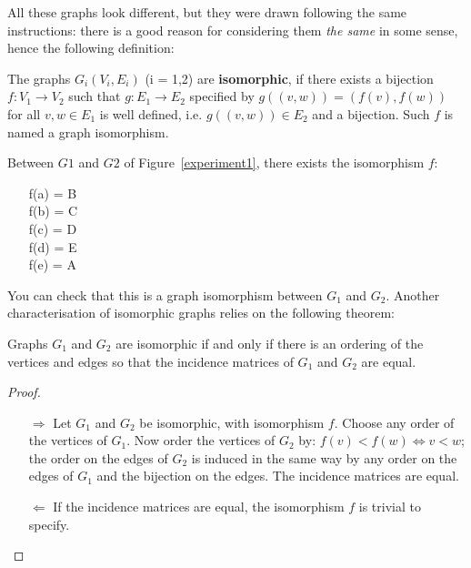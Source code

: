 All these graphs look different, but they were drawn following the
same instructions: there is a good reason for considering them {\em
the same} in some sense, hence the following definition:

\begin{definition}\label{isomorfegraphs}
\textup{The graphs $G_{i}(V_{i},E_{i})$ (i = 1,2) are
    \textbf{isomorphic}, if there exists a bijection $f: V_{1}
\rightarrow V_{2}$ such that $g: E_{1} \rightarrow E_{2}$ specified by
$g((v,w)) = (f(v),f(w))$ for all $v,w \in E_{1}$ is well defined,
i.e. $g((v,w)) \in E_{2}$ and a bijection.  Such $f$ is named a
graph isomorphism.}
\end{definition}

Between $G1$ and $G2$ of Figure~\ref{experiment1}, there exists
the isomorphism $f$:
\begin{itemize}
\item[]
f(a) = B\\
f(b) = C\\
f(c) = D\\
f(d) = E\\
f(e) = A
\end{itemize}

You can check that this is a graph isomorphism between $G_{1}$ and
$G_{2}$. Another characterisation of isomorphic graphs relies on the
following theorem:

\begin{theorem}
Graphs $G_{1}$ and $G_{2}$ are isomorphic if and only if there is an
ordering of the vertices and edges so that the incidence matrices of
$G_{1}$ and $G_{2}$ are equal.
\end{theorem}
\begin{proof}
~\\
\begin{itemize}
\item[$\Rightarrow$]
Let $G_{1}$ and $G_{2}$ be isomorphic, with isomorphism $f$.
Choose any order of the vertices of $G_{1}$. Now order the vertices of
$G_{2}$ by: $f(v) < f(w) \Leftrightarrow v < w$; the order on the
edges of $G_{2}$ is induced in the same way by any order on the edges
of $G_{1}$ and the bijection on the edges. The incidence matrices are
equal.
\item[$\Leftarrow$] If the incidence matrices are equal, the isomorphism $f$ is
trivial to specify.
\end{itemize}
\end{proof}

